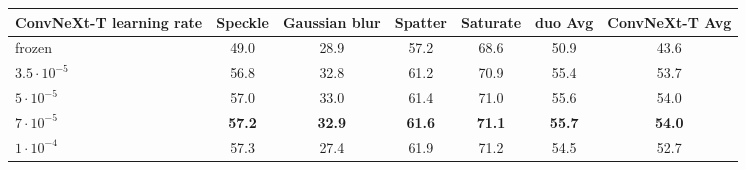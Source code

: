\begin{tabular}{@{}l cccc c c@{}}
\toprule
ConvNeXt-T learning rate & Speckle & Gaussian blur & Spatter & Saturate & duo Avg & ConvNeXt-T Avg \\
\midrule
frozen & 49.0 & 28.9 & 57.2 & 68.6 & 50.9 & 43.6 \\
\midrule
$3.5{\cdot}10^{-5}$ & 56.8 & 32.8 & 61.2 & 70.9 & 55.4 & 53.7 \\
$5{\cdot}10^{-5}$ & 57.0 & 33.0 & 61.4 & 71.0 & 55.6 & 54.0 \\
\textbf{$7{\cdot}10^{-5}$} & \textbf{57.2} & \textbf{32.9} & \textbf{61.6} & \textbf{71.1} & \textbf{55.7} & \textbf{54.0} \\
$1{\cdot}10^{-4}$ & 57.3 & 27.4 & 61.9 & 71.2 & 54.5 & 52.7 \\
\bottomrule
\end{tabular}
